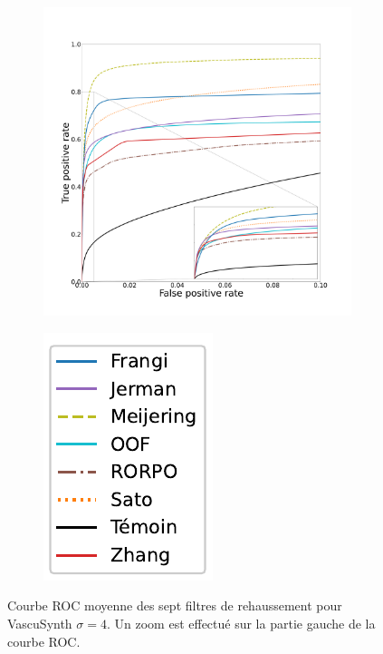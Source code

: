\begin{figure}[!ht]
  \begin{subfigure}[t]{0.78\textwidth}
    \centering
  \includegraphics[clip = true, trim  =  125 125 100 200, height=9cm]{Images/Vascu_4_ROC.pdf}
\end{subfigure}
\begin{subfigure}[t]{0.2\textwidth}
  \includegraphics[width=\textwidth,clip = true]{Images/standAloneLegend.pdf}
\end{subfigure}
\caption{Courbe ROC moyenne des sept filtres de rehaussement pour VascuSynth $\sigma=4$. Un zoom est effectué sur la partie gauche de la courbe ROC.}
\end{figure}

